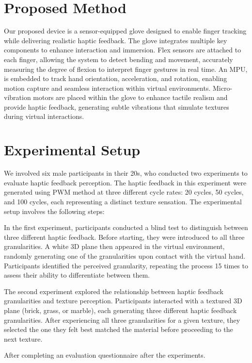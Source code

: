 \documentclass[a4paper,twocolumn]{article}
\begin{document}
\section{Proposed Method}
Our proposed device is a sensor-equipped glove designed to enable finger tracking while delivering realistic haptic feedback. The glove integrates multiple key components to enhance interaction and immersion. Flex sensors are attached to each finger, allowing the system to detect bending and movement, accurately measuring the degree of flexion to interpret finger gestures in real time. An MPU, is embedded to track hand orientation, acceleration, and rotation, enabling motion capture and seamless interaction within virtual environments. Micro-vibration motors are placed within the glove to enhance tactile realism and provide haptic feedback, generating subtle vibrations that simulate textures during virtual interactions.

\section{Experimental Setup}
We involved six male participants in their 20s, who conducted two experiments to evaluate haptic feedback perception. The haptic feedback in this experiment were generated using PWM method at three different cycle rates: 20 cycles, 50 cycles, and 100 cycles, each representing a distinct texture sensation. The experimental setup involves the following steps: \par
In the first experiment, participants conducted a blind test to distinguish between three different haptic feedback. Before starting, they were introduced to all three granularities. A white 3D plane then appeared in the virtual environment, randomly generating one of the granularities upon contact with the virtual hand. Participants identified the perceived granularity, repeating the process 15 times to assess their ability to differentiate between them.\par
The second experiment explored the relationship between haptic feedback granularities and texture perception. Participants interacted with a textured 3D plane (brick, grass, or marble), each generating three different haptic feedback granularities. After experiencing all three granularities for a given texture, they selected the one they felt best matched the material before proceeding to the next texture.\par
After completing an evaluation questionnaire after the experiments. 					
\end{document}

